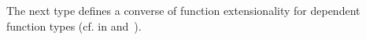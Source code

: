 The next type defines a converse of function extensionality for dependent function types (cf.  in  and~\cite[(2.9.2)]{HoTT}).
\ccpad
\begin{code}%
\>[1]\AgdaSpace{}%
\AgdaSymbol{:}\AgdaSpace{}%
\AgdaSymbol{\{}\AgdaSpace{}%
\AgdaSymbol{:}\AgdaSpace{}%
\AgdaSpace{}%
\AgdaSpace{}%
\AgdaSymbol{\}\{}\AgdaSpace{}%
\AgdaSymbol{:}\AgdaSpace{}%
\AgdaSpace{}%
\AgdaSpace{}%
\AgdaSpace{}%
\AgdaSpace{}%
\AgdaSymbol{\}(}\AgdaSpace{}%
\AgdaSpace{}%
\AgdaSymbol{:}\AgdaSpace{}%
\AgdaSpace{}%
\AgdaSymbol{)}\AgdaSpace{}%
\AgdaSpace{}%
\AgdaSpace{}%
\AgdaSpace{}%
\AgdaSpace{}%
\AgdaSpace{}%
\AgdaSpace{}%
\AgdaSpace{}%
\<%
\\
%
\>[1]\AgdaSpace{}%
\AgdaSymbol{\AgdaUnderscore{}}\AgdaSpace{}%
\AgdaSymbol{\AgdaUnderscore{}}\AgdaSpace{}%
\AgdaSpace{}%
\AgdaSymbol{\AgdaUnderscore{}}\AgdaSpace{}%
\AgdaSymbol{=}\AgdaSpace{}%
\<%
\end{code}
\ccpad
